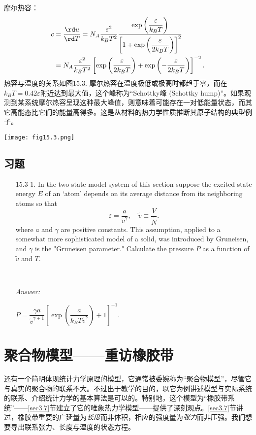 摩尔热容：
\begin{equation}
\begin{split}
	c &= \frac{\rd u}{\rd T} = N_A \frac{\varepsilon^2}{k_B T^2} \frac{\exp \left( \dfrac{\varepsilon}{k_B T} \right)}{\left[ 1 + \exp \left( \dfrac{\varepsilon}{2k_B T} \right) \right]^2} \\
	&= N_A \frac{\varepsilon^2}{k_B T^2} \left[ \exp \left( \frac{\varepsilon}{2k_B T} \right) + \exp \left(-\frac{\varepsilon}{2k_B T} \right) \right]^{-2}.
\end{split}
\label{equ15.13}
\end{equation}
热容与温度的关系如图15.3. 摩尔热容在温度极低或极高时都趋于零，而在$k_B T = 0.42 \varepsilon$附近达到最大值，这个峰称为“Schottky峰 (Schottky hump)”。如果观测到某系统摩尔热容呈现这种最大峰值，则意味着可能存在一对低能量状态，而其它高能态比它们的能量高得多。这是从材料的热力学性质推断其原子结构的典型例子。

{
	\centering
	\texttt{[image: fig15.3.png]}
	\label{fig15.3}
}

\subsection*{习题}
\begin{itemize}
	\item[15.3-1.]  In the two-state model system of this section suppose the excited state energy $E$ of an `atom' depends on its average distance from its neighboring atoms so that
	\[
		\varepsilon = \frac{a}{\tilde{v}^\gamma}, \quad \tilde{v} \equiv \frac{V}{\tilde{N}}.
	\]
	where $a$ and $\gamma$ are positive constants. This assumption, applied to a somewhat more sophisticated model of a solid, was introduced by Gruneisen, and $\gamma$ is the "Gruneisen parameter." Calculate the pressure $P$ as a function of $\tilde{v}$ and $T$.
	
	\  

	\begin{flushright}
	{\it Answer:}

	$P = \dfrac{\gamma a}{\tilde{v}^{\gamma + 1}} \left[ \exp \left(\dfrac{a}{k_B T \tilde{v}^\gamma} \right) + 1 \right]^{-1}$.
	\end{flushright}
\end{itemize}

\section{聚合物模型——重访橡胶带}
\label{sec15.4}
还有一个简明体现统计力学原理的模型，它通常被委婉称为“聚合物模型”，尽管它与真实的聚合物的联系不大。不过出于教学的目的，以它为例讲述模型与实际系统的联系、介绍统计力学的基本算法是可以的。特别地，这个模型为“橡胶带系统”——\ref{sec3.7}节建立了它的唯象热力学模型——提供了深刻观点。\ref{sec3.7}节讲过，橡胶带重要的广延量为{\it 长度}而非体积，相应的强度量为{\it 张力}而非压强。我们想要导出联系张力、长度与温度的状态方程。

